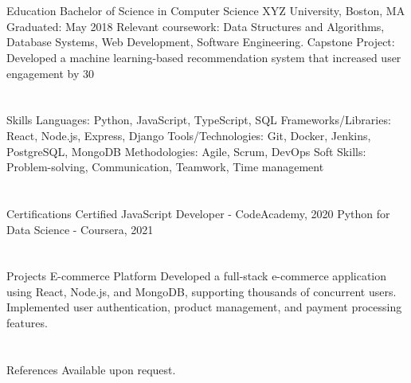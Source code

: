 \documentclass[10pt]{resume-template} %
\begin{document}
\section{\faCheckCircle}{\Large Education}
Bachelor of Science in Computer Science \hfill XYZ University, Boston, MA \hfill Graduated: May 2018
Relevant coursework: Data Structures and Algorithms, Database Systems, Web Development, Software Engineering.
Capstone Project: Developed a machine learning-based recommendation system that increased user engagement by 30%

\section{\faCheckCircle}{\Large Skills}
Languages: Python, JavaScript, TypeScript, SQL
Frameworks/Libraries: React, Node.js, Express, Django
Tools/Technologies: Git, Docker, Jenkins, PostgreSQL, MongoDB
Methodologies: Agile, Scrum, DevOps
Soft Skills: Problem-solving, Communication, Teamwork, Time management

\section{\faCheckCircle}{\Large Certifications}
Certified JavaScript Developer - CodeAcademy, 2020
Python for Data Science - Coursera, 2021

\section{\faCheckCircle}{\Large Projects}
E-commerce Platform
Developed a full-stack e-commerce application using React, Node.js, and MongoDB, supporting thousands of concurrent users.
Implemented user authentication, product management, and payment processing features.

\section{\faCheckCircle}{\Large References}
Available upon request.
\end{document}
